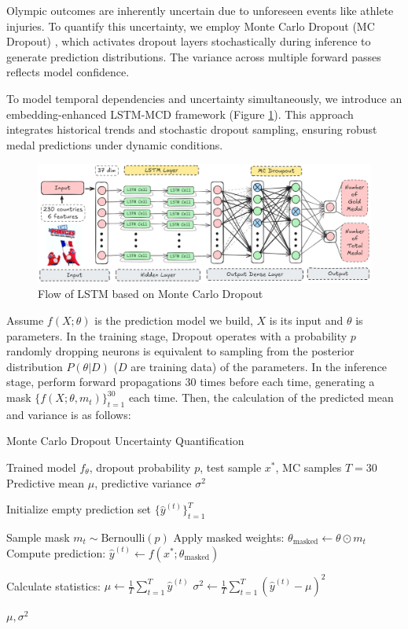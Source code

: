 \documentclass{mcmthesis}
\begin{document}
	 \hspace{1.5em}Olympic outcomes are inherently uncertain due to unforeseen events like athlete injuries. To quantify this uncertainty, we employ Monte Carlo Dropout (MC Dropout) \cite{gal2016dropout}, which activates dropout layers stochastically during inference to generate prediction distributions. The variance across multiple forward passes reflects model confidence.

	To model temporal dependencies and uncertainty simultaneously, we introduce an embedding-enhanced LSTM-MCD framework (Figure \ref{fig:LSTM-MCD}). This approach integrates historical trends and stochastic dropout sampling, ensuring robust medal predictions under dynamic conditions.
	\begin{figure}[H]
	\centering
	\includegraphics[width=1\linewidth]{fig/LSTM-MCD.png}
	\caption{Flow of LSTM based on Monte Carlo Dropout}
	\label{fig:LSTM-MCD}
    \end{figure}
  Assume $f(X;\theta)$ is the prediction model we build, $X$ is its input and $\theta$ is parameters. In the training stage, Dropout operates with a probability $p$
randomly dropping neurons is equivalent to sampling from the posterior distribution $P(\theta|D)$ ($D$ are training data) of the parameters. In the inference stage, perform forward propagations $30$ times before each time, generating a mask $\{f(X;\theta,m_t)\}_{t=1}^{30}$ each time. Then, the calculation of the predicted mean and variance is as follows:
\begin{algorithm}
	\caption{Monte Carlo Dropout Uncertainty Quantification}
	\begin{algorithmic}[1]
		\Require Trained model $f_\theta$, dropout probability $p$, test sample $x^*$, MC samples $T=30$
		\Ensure Predictive mean $\mu$, predictive variance $\sigma^2$
		
		\State Initialize empty prediction set $\{\hat{y}^{(t)}\}_{t=1}^T$
		
		\State Sample mask $m_t \sim \text{Bernoulli}(p)$ 
		\State Apply masked weights: $\theta_{\text{masked}} \gets \theta \odot m_t$
		\State Compute prediction: $\hat{y}^{(t)} \gets f(x^*; \theta_{\text{masked}})$
		\EndFor
		
		\State Calculate statistics:
		\State $\mu \gets \frac{1}{T}\sum_{t=1}^T \hat{y}^{(t)}$ 
		\State $\sigma^2 \gets \frac{1}{T}\sum_{t=1}^T (\hat{y}^{(t)} - \mu)^2$ 
		\EndFor
		
		\State \Return $\mu, \sigma^2$
	\end{algorithmic}
\end{algorithm}
\end{document}
